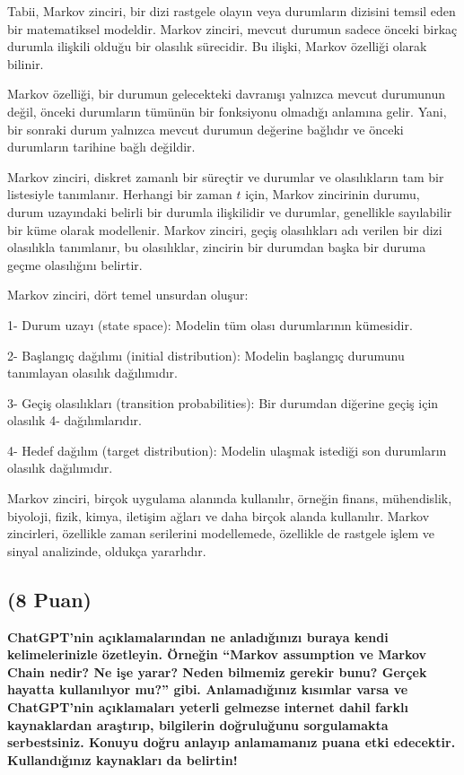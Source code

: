 \documentclass[11pt]{article}
\begin{document}
Tabii, Markov zinciri, bir dizi rastgele olayın veya durumların dizisini temsil eden bir matematiksel modeldir. Markov zinciri, mevcut durumun sadece önceki birkaç durumla ilişkili olduğu bir olasılık sürecidir. Bu ilişki, Markov özelliği olarak bilinir.

Markov özelliği, bir durumun gelecekteki davranışı yalnızca mevcut durumunun değil, önceki durumların tümünün bir fonksiyonu olmadığı anlamına gelir. Yani, bir sonraki durum yalnızca mevcut durumun değerine bağlıdır ve önceki durumların tarihine bağlı değildir.

Markov zinciri, diskret zamanlı bir süreçtir ve durumlar ve olasılıkların tam bir listesiyle tanımlanır. Herhangi bir zaman $t$ için, Markov zincirinin durumu, durum uzayındaki belirli bir durumla ilişkilidir ve durumlar, genellikle sayılabilir bir küme olarak modellenir. Markov zinciri, geçiş olasılıkları adı verilen bir dizi olasılıkla tanımlanır, bu olasılıklar, zincirin bir durumdan başka bir duruma geçme olasılığını belirtir.

Markov zinciri, dört temel unsurdan oluşur:

1- Durum uzayı (state space): Modelin tüm olası durumlarının kümesidir. 

2- Başlangıç dağılımı (initial distribution): Modelin başlangıç durumunu tanımlayan olasılık dağılımıdır.

3- Geçiş olasılıkları (transition probabilities): Bir durumdan diğerine geçiş için olasılık 4- dağılımlarıdır.

4- Hedef dağılım (target distribution): Modelin ulaşmak istediği son durumların olasılık dağılımıdır.

Markov zinciri, birçok uygulama alanında kullanılır, örneğin finans, mühendislik, biyoloji, fizik, kimya, iletişim ağları ve daha birçok alanda kullanılır. Markov zincirleri, özellikle zaman serilerini modellemede, özellikle de rastgele işlem ve sinyal analizinde, oldukça yararlıdır.


\subsection{(8 Puan)} \textbf{ChatGPT’nin açıklamalarından ne anladığınızı buraya kendi kelimelerinizle özetleyin. Örneğin ``Markov assumption ve Markov Chain nedir? Ne işe yarar? Neden bilmemiz gerekir bunu? Gerçek hayatta kullanılıyor mu?'' gibi. Anlamadığınız kısımlar varsa ve ChatGPT’nin açıklamaları yeterli gelmezse internet dahil farklı kaynaklardan araştırıp, bilgilerin doğruluğunu sorgulamakta serbestsiniz. Konuyu doğru anlayıp anlamamanız puana etki edecektir. Kullandığınız kaynakları da belirtin!}
\end{document}
